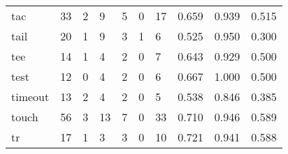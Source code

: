 \begin{longtable}{lp{2.0cm}p{2.0cm}p{2.0cm}p{2.0cm}p{2.0cm}p{2.0cm}p{2.0cm}p{2.0cm}p{2.0cm}}
tac       &                     33 &                                             2 &                                            9 &                                           5 &                                            0 &                                         17 &                                0.659 &                                  0.939 &                                0.515 \\
tail      &                     20 &                                             1 &                                            9 &                                           3 &                                            1 &                                          6 &                                0.525 &                                  0.950 &                                0.300 \\
tee       &                     14 &                                             1 &                                            4 &                                           2 &                                            0 &                                          7 &                                0.643 &                                  0.929 &                                0.500 \\
test      &                     12 &                                             0 &                                            4 &                                           2 &                                            0 &                                          6 &                                0.667 &                                  1.000 &                                0.500 \\
timeout   &                     13 &                                             2 &                                            4 &                                           2 &                                            0 &                                          5 &                                0.538 &                                  0.846 &                                0.385 \\
touch     &                     56 &                                             3 &                                           13 &                                           7 &                                            0 &                                         33 &                                0.710 &                                  0.946 &                                0.589 \\
tr        &                     17 &                                             1 &                                            3 &                                           3 &                                            0 &                                         10 &                                0.721 &                                  0.941 &                                0.588 \\

\end{longtable}
